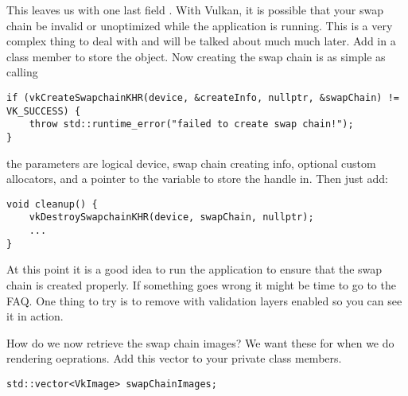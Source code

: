 \par This leaves us with one last field . With Vulkan, it is possible that your swap chain be invalid or unoptimized while the application is running. This is a very complex thing to deal with and will be talked about much much later. Add in a class member to store the  object. Now creating the swap chain is as simple as calling \\ 

\begin{center}
\begin{minipage}{0.95\linewidth}
\begin{lstlisting}
if (vkCreateSwapchainKHR(device, &createInfo, nullptr, &swapChain) != VK_SUCCESS) {
    throw std::runtime_error("failed to create swap chain!");
}
\end{lstlisting}
\end{minipage}
\end{center}

\par the parameters are logical device, swap chain creating info, optional custom allocators, and a pointer to the variable to store the handle in. Then just add: 

\begin{center}
\begin{minipage}{0.95\linewidth}
\begin{lstlisting}
void cleanup() {
    vkDestroySwapchainKHR(device, swapChain, nullptr);
    ...
}
\end{lstlisting}
\end{minipage}
\end{center}

\par At this point it is a good idea to run the application to ensure that the swap chain is created properly. If something goes wrong it might be time to go to the FAQ. One thing to try is to remove  with validation layers enabled so you can see it in action.

\par How do we now retrieve the swap chain images? We want these for when we do rendering oeprations. Add this vector to your private class members.

\begin{center}
\begin{minipage}{0.95\linewidth}
\begin{lstlisting}
std::vector<VkImage> swapChainImages;
\end{lstlisting}
\end{minipage}
\end{center}

